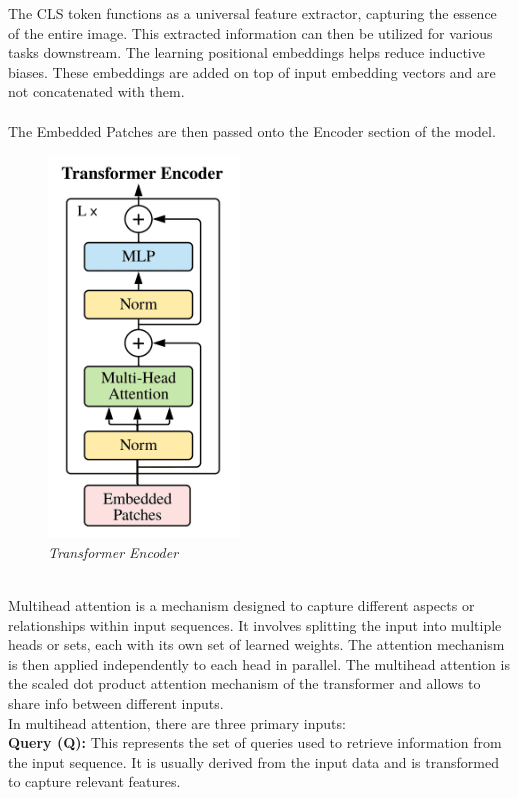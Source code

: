 The CLS token functions as a universal feature extractor, capturing the essence of the entire image. This extracted information can then be utilized for various tasks downstream. The learning positional embeddings helps reduce inductive biases. These embeddings are added on top of input embedding vectors and are not concatenated with them.\\
\\
The Embedded Patches are then passed onto the Encoder section of the model.\\
\begin{figure}[htbp]
    \centering
    \includegraphics[width=2in]{img/encoderblock.png}
    \caption{\textit{Transformer Encoder}}
\end{figure}\\

Multihead attention is a mechanism designed to capture different aspects or relationships within input sequences. It involves splitting the input into multiple heads or sets, each with its own set of learned weights. The attention mechanism is then applied independently to each head in parallel.
The multihead attention is the scaled dot product attention mechanism of the transformer and allows to share info between different inputs.\\

In multihead attention, there are three primary inputs:\\

\textbf{Query (Q):} This represents the set of queries used to retrieve information from the input sequence. It is usually derived from the input data and is transformed to capture relevant features.\\

